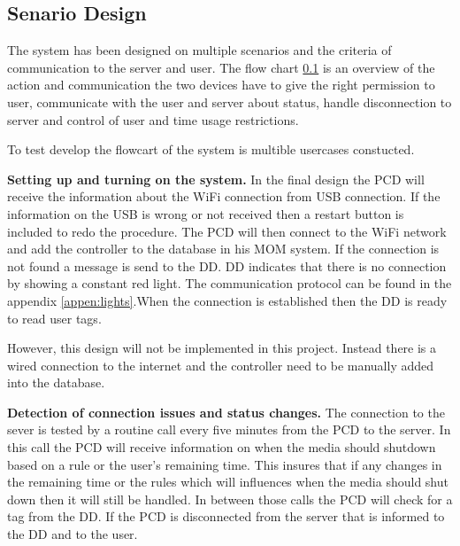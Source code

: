 \subsection{Senario Design}

The system has been designed on multiple scenarios and the criteria of communication to the server and user. The flow chart \ref{} is an overview of the action and communication the two devices have to give the right permission to user, communicate with the user and server about status, handle disconnection to server and control of user and time usage restrictions.\newline


To test develop the flowcart of the system is multible usercases constucted.\newline


\textbf{Setting up and turning on the system.} \newline
In the final design the PCD will receive the information about the WiFi connection from USB connection.
If the information on the USB is wrong or not received then a restart button is included to redo the procedure.  \newline
The PCD will then connect to the WiFi network and add the controller to the database in his MOM system. If the connection is not found a message is send to the DD. \newline 
DD indicates that there is no connection by showing a constant red light. The communication protocol can be found in the appendix \vref{appen:lights}.\newline When the connection is established then the DD is ready to read user tags.\newline

However, this design will not be implemented in this project. Instead there is a wired connection to the internet and the controller need to be manually added into the database.

\textbf{Detection of connection issues and status changes.} \newline
The connection to the sever is tested by a routine call every five minutes from the PCD to the server. In this call the PCD will receive information on when the media should shutdown based on a rule or the user's remaining time. This insures that if any changes in the remaining time or the rules which will influences when the media should shut down then it will still be handled.
In between those calls the PCD will check for a tag from the DD. If the PCD is disconnected from the server that is informed to the DD and to the user.  \newline
	
